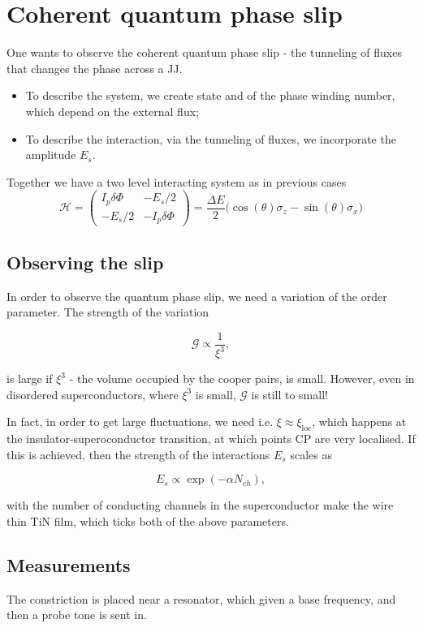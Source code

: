  \section{Coherent quantum phase slip}
  One wants to observe the coherent quantum phase slip - the tunneling of fluxes that changes the phase across a JJ. 
  
  \begin{itemize}
  	\item To describe the system, we create state  and  of the phase winding number, which depend on the external flux;
  	\item To describe the interaction, via the tunneling of fluxes, we incorporate the amplitude $ E_s $.
  \end{itemize}

  Together we have a two level interacting system as in previous cases
  \[
  \mathcal{H} = \begin{pmatrix}
  I_p\delta\Phi & -E_s/2\\-E_s/2 & -I_p\delta\Phi
  \end{pmatrix} = \frac{\Delta E}{2}\big(\cos(\theta)\sigma_z - \sin(\theta)\sigma_x\big)
  \]
  
  \subsection{Observing the slip}
   In order to observe the quantum phase slip, we need a variation of the order parameter. The strength of the variation
   
   \[
   	\mathcal{G} \propto \frac{1}{\xi^3},
   \]
   
   \noindent is large if $ \xi^3 $ - the volume occupied by the cooper pairs, is small. However, even in disordered superconductors, where $ \xi^3 $ is small, $ \mathcal{G} $ is still to small!
   
   In fact, in order to get large fluctuations, we need  i.e. $ \xi\approx\xi_\text{loc} $, which happens at the insulator-superoconductor transition, at which points CP are very localised. If this is achieved, then the strength of the interactions $ E_s $ scales as
   
   \[
   E_s \propto \exp(-\alpha N_{ch}),
   \]
   
   \noindent with the number of conducting channels in the superconductor \ra make the wire thin TiN film, which ticks both of the above parameters.
   
   \subsection{Measurements}
    The constriction is placed near a resonator, which given a base frequency, and then a probe tone is sent in.
    
